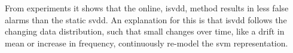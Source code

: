 From experiments it shows that the online, \gls{isvdd}, method results in less false alarms than the static \gls{svdd}.
An explanation for this is that \gls{isvdd} follows the changing data distribution, such that small changes over time, like a drift in mean or increase in frequency, continuously re-model the \gls{svm} representation.